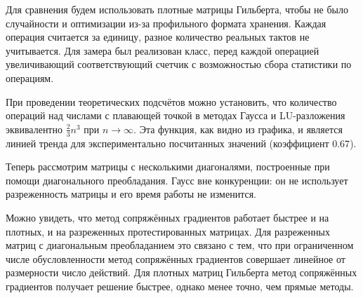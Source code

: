\documentclass[russian, english]{article}
\begin{document}
\begin{minipage}{\textwidth}
Для сравнения будем использовать плотные матрицы Гильберта, чтобы не было случайности и оптимизации из-за профильного формата хранения. Каждая операция считается за единицу, разное количество реальных тактов не учитывается. Для замера был реализован класс, перед каждой операцией увеличивающий соответствующий счетчик с возможностью сбора статистики по операциям.

\end{minipage}

При проведении теоретических подсчётов можно установить, что количество операций над числами с плавающей точкой в методах Гаусса и LU-разложения эквивалентно $\frac{2}{3}n^3$ при $n \rightarrow \infty$. Эта функция, как видно из графика, и является линией тренда для экспериментально посчитанных значений (коэффициент $0.67$).

\begin{minipage}{\textwidth}
Теперь рассмотрим матрицы с несколькими диагоналями, построенные при помощи диагонального преобладания. Гаусс вне конкуренции: он не использует разреженность матрицы и его время работы не изменится.

\end{minipage}

Можно увидеть, что метод сопряжённых градиентов работает быстрее и на плотных, и на разреженных протестированных матрицах. Для разреженных матриц с диагональным преобладанием это связано с тем, что при ограниченном числе обусловленности метод сопряжённых градиентов совершает линейное от размерности число действий. Для плотных матриц Гильберта метод сопряжённых градиентов получает решение быстрее, однако менее точно, чем прямые методы.
\end{document}
